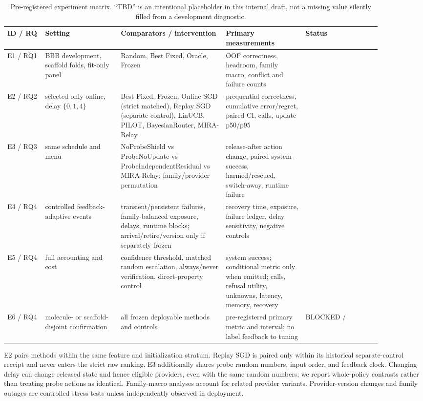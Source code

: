 \documentclass[sigconf,anonymous]{aamas}
\newcommand{\tbd}{\text{TBD}}
\begin{document}
\begin{table}[t]
\caption{Pre-registered experiment matrix. ``TBD'' is an intentional placeholder in this internal draft, not a missing value silently filled from a development diagnostic.}
\label{tab:matrix}
\small
\begin{tabular}{p{0.09\linewidth}p{0.18\linewidth}p{0.25\linewidth}p{0.19\linewidth}p{0.18\linewidth}}
\toprule
ID / RQ & Setting & Comparators / intervention & Primary measurements & Status \\
\midrule
E1 / RQ1 & BBB development, scaffold folds, fit-only panel & Random, Best Fixed, Oracle, Frozen & OOF correctness, headroom, family macro, conflict and failure counts & \tbd{} \\
E2 / RQ2 & selected-only online, delay $\{0,1,4\}$ & Best Fixed, Frozen, Online SGD (strict matched), Replay SGD (separate-control), LinUCB, PILOT, BayesianRouter, MIRA-Relay & prequential correctness, cumulative error/regret, paired CI, calls, update p50/p95 & \tbd{} \\
E3 / RQ3 & same schedule and menu & NoProbeShield vs ProbeNoUpdate vs ProbeIndependentResidual vs MIRA-Relay; family/provider permutation & release-after action change, paired system-success, harmed/rescued, switch-away, runtime failure & \tbd{} \\
E4 / RQ4 & controlled feedback-adaptive events & transient/persistent failures, family-balanced exposure, delays, runtime blocks; arrival/retire/version only if separately frozen & recovery time, exposure, failure ledger, delay sensitivity, negative controls & \tbd{} \\
E5 / RQ4 & full accounting and cost & confidence threshold, matched random escalation, always/never verification, direct-property control & system success; conditional metric only when emitted; calls, refusal utility, unknowns, latency, memory, recovery & \tbd{} \\
E6 / RQ4 & molecule- or scaffold-disjoint confirmation & all frozen deployable methods and controls & pre-registered primary metric and interval; no label feedback to tuning & BLOCKED / \tbd{} \\
\bottomrule
\end{tabular}
\end{table}

E2 pairs methods within the same feature and initialization stratum. Replay SGD is paired only within its historical separate-control receipt and never enters the strict raw ranking. E3 additionally shares probe random numbers, input order, and feedback clock. Changing delay can change released state and hence eligible providers, even with the same random numbers; we report whole-policy contrasts rather than treating probe actions as identical. Family-macro analyses account for related provider variants. Provider-version changes and family outages are controlled stress tests unless independently observed in deployment.
\end{document}
